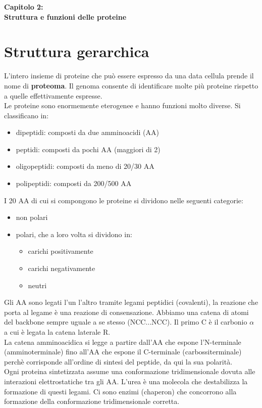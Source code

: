 \Huge\textbf{Capitolo 2: \\ Struttura e funzioni delle proteine}

\section{Struttura gerarchica}
    \small
    L'intero insieme di proteine che può essere espresso da una data cellula prende il nome di \textbf{proteoma}. Il genoma consente di identificare molte più proteine rispetto a quelle effettivamente espresse.\\
    Le proteine sono enormemente eterogenee e hanno funzioni molto diverse. Si classificano in:
    \begin{itemize}
        \item dipeptidi: composti da due amminoacidi (AA)
        \item peptidi: composti da pochi AA (maggiori di 2)
        \item oligopeptidi: composti da meno di 20/30 AA
        \item polipeptidi: composti da 200/500 AA 
    \end{itemize}
    I 20 AA di cui si compongono le proteine si dividono nelle seguenti categorie:
    \begin{itemize}
        \item non polari
        \item polari, che a loro volta si dividono in: 
        \begin{itemize}
            \item carichi positivamente
            \item carichi negativamente
            \item neutri
        \end{itemize}
    \end{itemize}
    Gli AA sono legati l'un l'altro tramite legami peptidici (covalenti), la reazione che porta al legame è una reazione di consensazione. Abbiamo una catena di atomi del backbone sempre uguale a se stesso (NCC...NCC). Il primo C è il carbonio $\alpha$ a cui è legata la catena laterale R.\\
    La catena amminoacidica si legge a partire dall'AA che espone l'N-terminale (amminoterminale) fino all'AA che espone il C-terminale (carbossiterminale) perchè corrisponde all'ordine di sintesi del peptide, da qui la sua polarità.\\
    Ogni proteina sintetizzata assume una conformazione tridimensionale dovuta alle interazioni elettrostatiche tra gli AA. L'urea è una molecola che destabilizza la formazione di questi legami. Ci sono enzimi (chaperon) che concorrono alla formazione della conformazione tridimensionale corretta.\\
